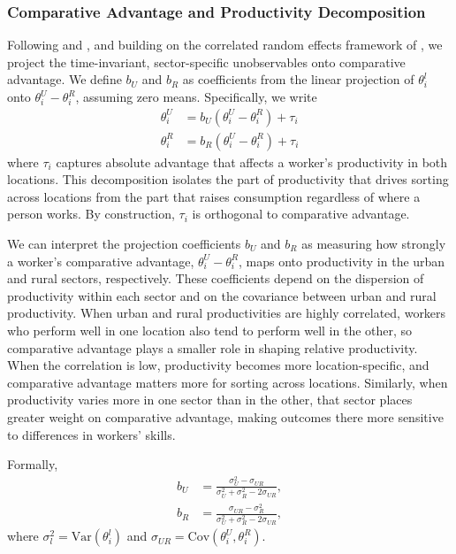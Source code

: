 \documentclass[12pt]{article}
\begin{document}
\subsubsection{Comparative Advantage and Productivity Decomposition}

Following \cite{lemieuxEstimatingEffectsUnions1998} and \cite{suriSelectionComparativeAdvantage2011}, and building on the correlated random effects framework of \citet{chamberlain1984panel}, we project the time-invariant, sector-specific unobservables onto comparative advantage.
We define $b_U$ and $b_R$ as coefficients from the linear projection of $\theta^{l}_{i}$ onto $\theta^{U}_{i} - \theta^{R}_{i}$, assuming zero means.  
Specifically, we write
\begin{align}
    \theta_i^U&=b_U(\theta_i^U-\theta_i^R)+\tau_i\\
    \theta_i^R&=b_R(\theta_i^U-\theta_i^R)+\tau_i
\end{align}
\noindent where $\tau_{i}$ captures absolute advantage that affects a worker's productivity in both locations.
This decomposition isolates the part of productivity that drives sorting across locations from the part that raises consumption regardless of where a person works.
By construction, $\tau_{i}$ is orthogonal to comparative advantage.

We can interpret the projection coefficients $b_{U}$ and $b_{R}$ as measuring how strongly a worker's comparative advantage, $\theta_{i}^U-\theta_{i}^R$, maps onto productivity in the urban and rural sectors, respectively.
These coefficients depend on the dispersion of productivity within each sector and on the covariance between urban and rural productivity.
When urban and rural productivities are highly correlated, workers who perform well in one location also tend to perform well in the other, so comparative advantage plays a smaller role in shaping relative productivity.
When the correlation is low, productivity becomes more location-specific, and comparative advantage matters more for sorting across locations.
Similarly, when productivity varies more in one sector than in the other, that sector places greater weight on comparative advantage, making outcomes there more sensitive to differences in workers' skills.

Formally, 
\begin{align}
b_U &= \frac{\sigma_U^2-\sigma_{UR}}{\sigma_U^2+\sigma_R^2-2\sigma_{UR}}, \\
b_R &= \frac{\sigma_{UR}-\sigma_R^2}{\sigma_U^2+\sigma_R^2-2\sigma_{UR}},
\end{align}
where $\sigma_l^2=\text{Var}(\theta_i^l)$ and $\sigma_{UR}=\text{Cov}(\theta_i^U,\theta_i^R)$.
\end{document}
